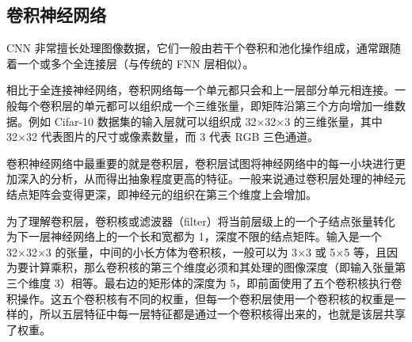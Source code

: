 \documentclass[lang=cn,11pt,a4paper]{elegantpaper}
\begin{document}

\subsection{卷积神经网络}
CNN 非常擅长处理图像数据，它们一般由若干个卷积和池化操作组成，通常跟随着一个或多个全连接层（与传统的 FNN 层相似）。

相比于全连接神经网络，卷积网络每一个单元都只会和上一层部分单元相连接。一般每个卷积层的单元都可以组织成一个三维张量，即矩阵沿第三个方向增加一维数据\cite{8}。例如 Cifar-10 数据集的输入层就可以组织成 32×32×3 的三维张量，其中 32×32 代表图片的尺寸或像素数量，而 3 代表 RGB 三色通道。

卷积神经网络中最重要的就是卷积层，卷积层试图将神经网络中的每一小块进行更加深入的分析，从而得出抽象程度更高的特征\cite{9}。一般来说通过卷积层处理的神经元结点矩阵会变得更深，即神经元的组织在第三个维度上会增加。

为了理解卷积层，卷积核或滤波器（filter）将当前层级上的一个子结点张量转化为下一层神经网络上的一个长和宽都为 1，深度不限的结点矩阵。输入是一个 32×32×3 的张量，中间的小长方体为卷积核，一般可以为 3×3 或 5×5 等，且因为要计算乘积，那么卷积核的第三个维度必须和其处理的图像深度（即输入张量第三个维度 3）相等。最右边的矩形体的深度为 5，即前面使用了五个卷积核执行卷积操作。这五个卷积核有不同的权重，但每一个卷积层使用一个卷积核的权重是一样的，所以五层特征中每一层特征都是通过一个卷积核得出来的，也就是该层共享了权重。



\end{document}
